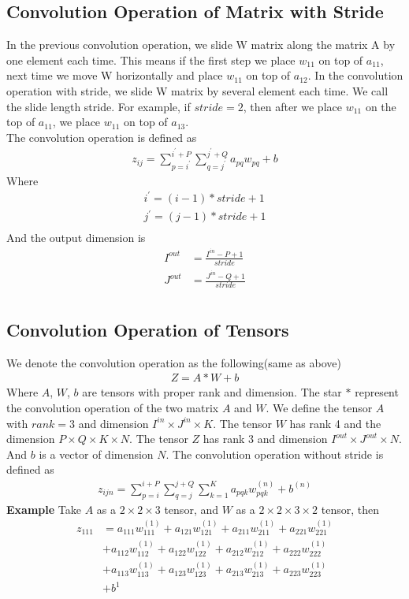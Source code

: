 \documentclass[a4paper]{article}
\begin{document}
\subsection{Convolution Operation of Matrix with Stride}
In the previous convolution operation, we slide W matrix along the matrix A by one element each time. This means if the first step we place $w_{11}$ on top of $a_{11}$, next time we move W horizontally and place $w_{11}$ on top of $a_{12}$. In the convolution operation with stride, we slide W matrix by several element each time. We call the slide length stride. For example, if $stride = 2$, then after we place $w_{11}$ on the top of $a_{11}$, we place $w_{11}$ on top of $a_{13}$.\\  
The convolution operation is defined as 
\begin{align*}
	z_{ij} = \sum_{p=i^{'}}^{i^{'}+P} \sum_{q=j^{'}}^{j^{'}+Q}  a_{pq} w_{pq} + b
\end{align*}
Where 
\begin{align*}
	i^{'} = (i-1)*stride +1\\
	j^{'} = (j-1)*stride +1\\
\end{align*}
And the output dimension is
\begin{align*}
	I^{out} & = \frac{I^{in} - P + 1}{stride} \\
	J^{out} & = \frac{J^{in} - Q + 1}{stride} \\
\end{align*}
\subsection{Convolution Operation of Tensors}
We denote the convolution operation as the following(same as above)
\begin{align*}
	Z= A*W +b
\end{align*}
Where $A$, $W$, $b$ are tensors with proper rank and dimension. The star $*$ represent the convolution operation of the two matrix $A$ and $W$. We define the tensor $A$ with $rank=3$ and dimension $I^{in} \times J^{in} \times K$. The tensor $W$ has rank 4 and the dimension $P \times Q \times K \times N$. The tensor $Z$ has rank 3 and dimension $I^{out} \times J^{out} \times N$. And $b$ is a vector of dimension $N$. The convolution operation without stride is defined as 
\begin{align*}
	z_{ijn} = \sum_{p=i}^{i+P} \sum_{q=j}^{j+Q} \sum_{k=1}^{K} a_{pqk} w_{pqk}^{(n)} + b^{(n)}
\end{align*}
{\bf Example}
Take $A$ as a $2 \times 2 \times 3$ tensor, and $W$ as a $2 \times 2 \times 3 \times 2$ tensor, then 
\begin{align*}
z_{111} & = a_{111} w_{111}^{(1)} + a_{121} w_{121}^{(1)} + a_{211} w_{211}^{(1)} + a_{221} w_{221}^{(1)}\\
		& + a_{112} w_{112}^{(1)} + a_{122} w_{122}^{(1)} + a_{212} w_{212}^{(1)} + a_{222} w_{222}^{(1)}\\	
		& + a_{113} w_{113}^{(1)} + a_{123} w_{123}^{(1)} + a_{213} w_{213}^{(1)} + a_{223} w_{223}^{(1)}\\	
		& + b^{1}\\
\end{align*}
\end{document}
